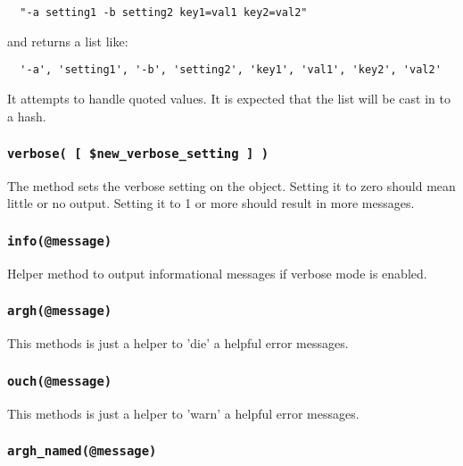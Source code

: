 \begin{verbatim}
  "-a setting1 -b setting2 key1=val1 key2=val2"
\end{verbatim}


and returns a list like:

\begin{verbatim}
  '-a', 'setting1', '-b', 'setting2', 'key1', 'val1', 'key2', 'val2'
\end{verbatim}


It attempts to handle quoted values.  It is expected that the list
will be cast in to a hash.

\subsubsection*{\texttt{verbose( [ \$new\_verbose\_setting ] )}\label{xPL::Base_verbose_new_verbose_setting_}}


The method sets the verbose setting on the object.  Setting it to zero
should mean little or no output.  Setting it to 1 or more should
result in more messages.

\subsubsection*{\texttt{info(@message)}\label{xPL::Base_info_message_}}


Helper method to output informational messages if verbose mode is enabled.

\subsubsection*{\texttt{argh(@message)}\label{xPL::Base_argh_message_}}


This methods is just a helper to 'die' a helpful error messages.

\subsubsection*{\texttt{ouch(@message)}\label{xPL::Base_ouch_message_}}


This methods is just a helper to 'warn' a helpful error messages.

\subsubsection*{\texttt{argh\_named(@message)}\label{xPL::Base_argh_named_message_}}


